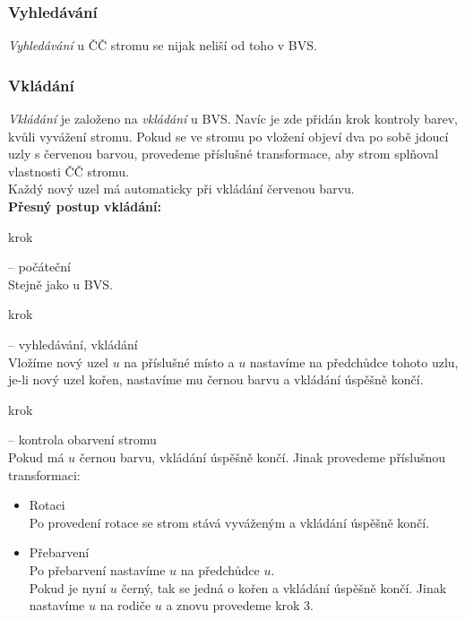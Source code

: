 \documentclass[
  biblatex=false,
  font=serif,
  glossaries=false,
  tables=false,
  theorems=false,
  index
]{kidiplom}
\begin{document}
\subsubsection{Vyhledávání}
\indent\indent \textit{Vyhledávání} u ČČ stromu se nijak neliší od toho v BVS.


\subsubsection{Vkládání}
\indent\indent \textit{Vkládání} je založeno na \textit{vkládání} u BVS. Navíc je zde přidán krok kontroly barev, kvůli vyvážení stromu. Pokud se ve stromu po vložení objeví dva po sobě jdoucí uzly s červenou barvou, provedeme příslušné transformace, aby strom splňoval vlastnosti ČČ stromu.\\
\indent Každý nový uzel má automaticky při vkládání červenou barvu.\\

\noindent \textbf{Přesný postup vkládání:}
\begin{enumerate} {\bfseries
\item  krok} -- počáteční \\
Stejně jako u BVS.
{\bfseries\item  krok} -- vyhledávání, vkládání \\
Vložíme nový uzel $u$ na příslušné místo a $u$ nastavíme na předchůdce tohoto uzlu, je-li nový uzel kořen, nastavíme mu černou barvu a vkládání úspěšně končí.
{\bfseries\item  krok} -- kontrola obarvení stromu \\
Pokud má $u$ černou barvu, vkládání úspěšně končí. Jinak provedeme příslušnou transformaci:
\begin{itemize}
\item Rotaci\\
Po provedení rotace se strom stává vyváženým a vkládání úspěšně končí.
\item Přebarvení\\
Po přebarvení nastavíme $u$ na předchůdce $u$.\\
Pokud je nyní $u$ černý, tak se jedná o kořen a vkládání úspěšně končí. Jinak nastavíme $u$ na rodiče $u$ a znovu provedeme krok 3.
\end{itemize}
\end{enumerate}
\end{document}
